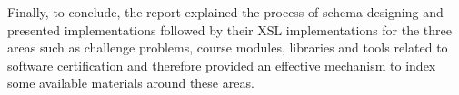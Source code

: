 \documentclass[11pt,letterpaper]{report}
\begin{document}
Finally, to conclude, the report explained the process of schema designing and presented implementations followed by their XSL implementations for the three areas such as challenge problems, course modules, libraries and tools related to software certification and therefore provided an effective mechanism to index some available materials around these areas. 



\end{document}
